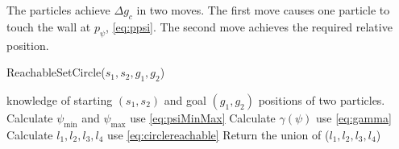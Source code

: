 The particles achieve $\Delta g_c$ in two moves. The first move causes one particle to touch the wall at $p_\psi$, \eqref{eq:ppsi}. The second move achieves the required relative position.
 
\begin{algorithm}[htb]
\caption{ { \sc ReachableSetCircle}($s_1,s_2,g_1,g_2$)}\label{alg:circularReachbale}
\begin{algorithmic}[1]
\Require knowledge of starting $(s_1,s_2)$ and goal $(g_1,g_2)$ positions of  two particles. 
\State Calculate $\psi_{\min}$ and $\psi_{\max}$ \Comment use \eqref{eq:psiMinMax}
\State Calculate $\gamma(\psi)$ \Comment use \eqref{eq:gamma}
\State Calculate $l_1, l_2, l_3, l_4$ \Comment use \eqref{eq:circlereachable} 
\State Return the union of ($l_1, l_2, l_3, l_4$)
\end{algorithmic}
\end{algorithm}
 
% 
 

   

